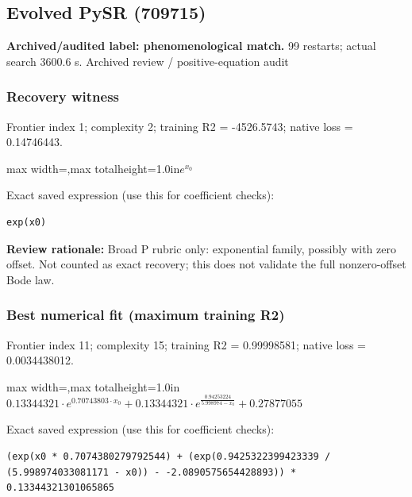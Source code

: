 \documentclass[10pt,letterpaper,landscape]{article}
\begin{document}
\begin{minipage}[t]{0.485\textwidth}
\subsection*{Evolved PySR (709715)}
\textbf{Archived/audited label: phenomenological match.} 99 restarts; actual search 3600.6 s.
{\small Archived review / positive-equation audit}
\subsubsection*{Recovery witness}
Frontier index 1; complexity 2; training R2 = -4526.5743; native loss = 0.14746443.
\begin{center}\begin{adjustbox}{max width=\linewidth,max totalheight=1.0in}$\displaystyle e^{x_{0}}$\end{adjustbox}\end{center}
{\scriptsize Exact saved expression (use this for coefficient checks):}
\begin{lstlisting}
exp(x0)
\end{lstlisting}
{\small\textbf{Review rationale:} Broad P rubric only: exponential family, possibly with zero offset. Not counted as exact recovery; this does not validate the full nonzero-offset Bode law.}
\subsubsection*{Best numerical fit (maximum training R2)}
Frontier index 11; complexity 15; training R2 = 0.99998581; native loss = 0.0034438012.
\begin{center}\begin{adjustbox}{max width=\linewidth,max totalheight=1.0in}$\displaystyle 0.13344321 \cdot e^{0.70743803 \cdot x_{0}} + 0.13344321 \cdot e^{\frac{0.94253224}{5.998974 - x_{0}}} + 0.27877055$\end{adjustbox}\end{center}
{\scriptsize Exact saved expression (use this for coefficient checks):}
\begin{lstlisting}
(exp(x0 * 0.7074380279792544) + (exp(0.9425322399423339 / (5.998974033081171 - x0)) - -2.0890575654428893)) * 0.13344321301065865
\end{lstlisting}
\end{minipage}
\clearpage{}\label{bode-10003}
\end{document}
